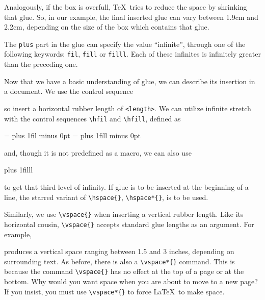 \documentclass[10pt,landscape,letterpaper]{article}
\begin{document}
\begin{multicols*}{3}
Analogously, if the box is overfull, \TeX\ tries to reduce the space by shrinking that glue. So, in our example, the final inserted glue can vary between 1.9cm and 2.2cm, depending on the size of the box which contains that glue.

The \verb|plus| part in the glue can specify the value ``infinite'', through one of the following keywords: \verb|fil|, \verb|fill| or \verb|filll|. Each of these infinites is infinitely greater than the preceding one.

Now that we have a basic understanding of glue, we can describe its insertion in a document. We use the control sequence
\begin{macrocode}
\hspace{<length>}
\end{macrocode}
so insert a horizontal rubber length of \verb|<length>|. We can utilize infinite stretch with the control sequences \verb|\hfil| and \verb|\hfill|, defined as
\begin{macrocode}
\hfil = \hskip 0pt plus 1fil minus 0pt
\hfill = \hskip 0pt plus 1fill minus 0pt
\end{macrocode}
and, though it is not predefined as a macro, we can also use
\begin{macrocode}
\hskip 0pt plus 1filll
\end{macrocode}
to get that third level of infinity. If glue is to be inserted at the beginning of a line, the starred variant of \verb|\hspace{}|, \verb|\hspace*{}|, is to be used. 

Similarly, we use \verb|\vspace{}| when inserting a vertical rubber length. Like its horizontal cousin, \verb|\vspace{}| accepts standard glue lengths as an argument. For example,
\begin{macrocode}
\vspace{2in plus 1in minus 0.5in}
\end{macrocode}
produces a vertical space ranging between 1.5 and 3 inches, depending on surrounding text. As before, there is also a \verb|\vspace*{}| command. This is because the command \verb|\vspace{}| has no effect at the top of a page or at the bottom. Why would you want space when you are about to move to a new page? If you insist, you must use \verb|\vspace*{}| to force \LaTeX\ to make space.




\end{multicols*}
\end{document}
